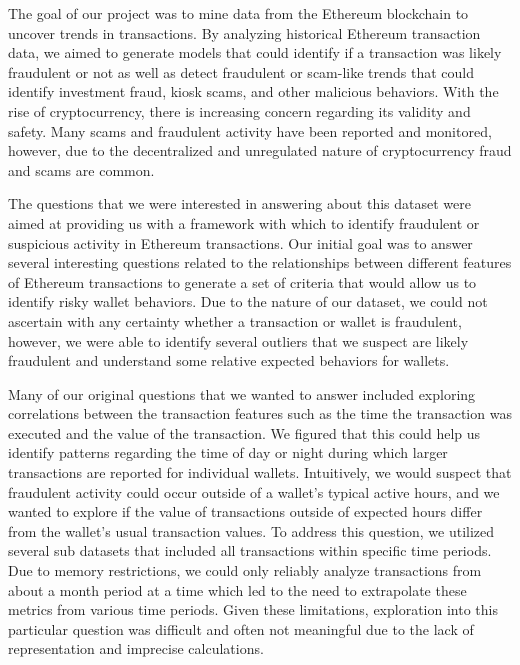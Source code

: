 \documentclass[sigconf]{acmart}
\begin{document}
The goal of our project was to mine data from the Ethereum blockchain to uncover trends in transactions. By analyzing historical Ethereum transaction data, we aimed to generate models that could identify if a transaction was likely fraudulent or not as well as detect fraudulent or scam-like trends that could identify investment fraud, kiosk scams, and other malicious behaviors. With the rise of cryptocurrency, there is increasing concern regarding its validity and safety. Many scams and fraudulent activity have been reported and monitored, however, due to the decentralized and unregulated nature of cryptocurrency fraud and scams are common. 

The questions that we were interested in answering about this dataset were aimed at providing us with a framework with which to identify fraudulent or suspicious activity in Ethereum transactions. Our initial goal was to answer several interesting questions related to the relationships between different features of Ethereum transactions to generate a set of criteria that would allow us to identify risky wallet behaviors. Due to the nature of our dataset, we could not ascertain with any certainty whether a transaction or wallet is fraudulent, however, we were able to identify several outliers that we suspect are likely fraudulent and understand some relative expected behaviors for wallets.

Many of our original questions that we wanted to answer included exploring correlations between the transaction features such as the time the transaction was executed and the value of the transaction. We figured that this could help us identify patterns regarding the time of day or night during which larger transactions are reported for individual wallets. Intuitively, we would suspect that fraudulent activity could occur outside of a wallet’s typical active hours, and we wanted to explore if the value of transactions outside of expected hours differ from the wallet’s usual transaction values. To address this question, we utilized several sub datasets that included all transactions within specific time periods. Due to memory restrictions, we could only reliably analyze transactions from about a month period at a time which led to the need to extrapolate these metrics from various time periods. Given these limitations, exploration into this particular question was difficult and often not meaningful due to the lack of representation and imprecise calculations.  
\end{document}
